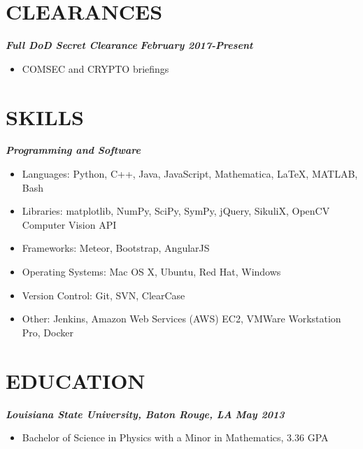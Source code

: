 \documentclass{res}
\begin{document}
\begin{resume}
\section{CLEARANCES}
	{\bfseries {\em Full DoD Secret Clearance}} \hfill  {\bfseries{\em February 2017-Present}}
 		\begin{itemize} 
		\item COMSEC and CRYPTO briefings
	 	\end{itemize}

\section{SKILLS}
	{\bfseries {\em Programming and Software}}
 		\begin{itemize} 
		\item Languages: Python, C++, Java, JavaScript, Mathematica, \LaTeX{}, MATLAB, Bash
		\item Libraries: matplotlib, NumPy, SciPy, SymPy, jQuery, SikuliX, OpenCV Computer Vision API
		\item Frameworks: Meteor, Bootstrap, AngularJS
		\item Operating Systems: Mac OS X, Ubuntu, Red Hat, Windows
		\item Version Control: Git, SVN, ClearCase
		\item Other: Jenkins, Amazon Web Services (AWS) EC2, VMWare Workstation Pro, Docker
	 	\end{itemize}
		
\section{EDUCATION}
	{\bfseries {\em  Louisiana State University, Baton Rouge, LA}} \hfill   {\bfseries {\em May 2013}}\
                \begin{itemize}  \itemsep -14pt
                \item Bachelor of Science in Physics with a Minor in Mathematics, 3.36 GPA\\
                \end{itemize}


\end{resume}
\end{document}
